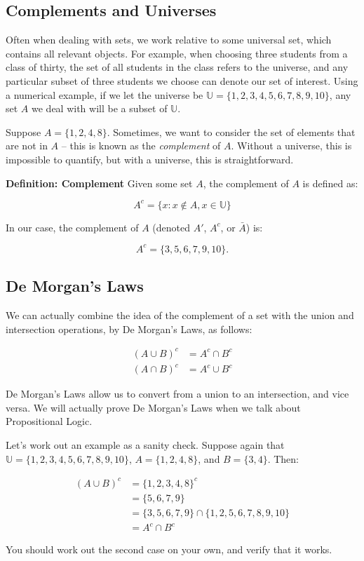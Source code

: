 \documentclass{article}
\begin{document}
\subsection*{Complements and Universes}
Often when dealing with sets, we work relative to some universal set, which contains all relevant objects. For example, when choosing three students from a class of thirty, the set of all students in the class refers to the universe, and any particular subset of three students we choose can denote our set of interest. Using a numerical example, if we let the universe be $\mathbb{U} = \{1, 2, 3, 4, 5, 6, 7, 8, 9, 10\}$, any set $A$ we deal with will be a subset of $\mathbb{U}$.

Suppose $A = \{1, 2, 4, 8\}$. Sometimes, we want to consider the set of elements that are not in $A$ – this is known as the \textit{complement} of $A$. Without a universe, this is impossible to quantify, but with a universe, this is straightforward.

\textbf{Definition: Complement}  
Given some set $A$, the complement of $A$ is defined as:

\[
A^c = \{x : x \not \in A, x \in \mathbb{U} \}
\]

In our case, the complement of $A$ (denoted $A'$, $A^{c}$, or $\bar{A}$) is:

\[
A^c = \{3, 5, 6, 7, 9, 10\}.
\]

\subsection*{De Morgan’s Laws}
We can actually combine the idea of the complement of a set with the union and intersection operations, by De Morgan’s Laws, as follows:

\[
\boxed{\begin{aligned}
(A \cup B)^c &= A^c \cap B^c \\
(A \cap B)^c &= A^c \cup B^c
\end{aligned}}
\]

De Morgan’s Laws allow us to convert from a union to an intersection, and vice versa. We will actually prove De Morgan’s Laws when we talk about Propositional Logic.

Let’s work out an example as a sanity check. Suppose again that $\mathbb{U} = \{1, 2, 3, 4, 5, 6, 7, 8, 9, 10\}$, $A = \{1, 2, 4, 8\}$, and $B = \{3, 4\}$. Then:

\[
\begin{aligned}
(A \cup B)^c &= \{1, 2, 3, 4, 8 \}^c \\
&= \{5, 6, 7, 9\} \\
&= \{3, 5, 6, 7, 9\} \cap \{1, 2, 5, 6, 7, 8, 9, 10\} \\
&= A^c \cap B^c
\end{aligned}
\]

You should work out the second case on your own, and verify that it works.
\end{document}

